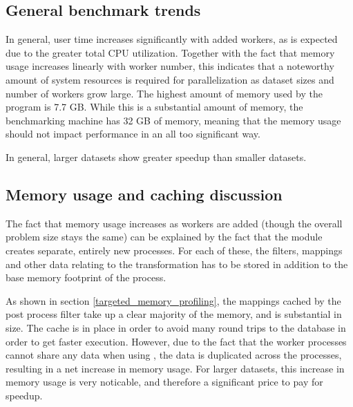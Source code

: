 \subsection{General benchmark trends}
In general, user time increases significantly with added workers, as is expected due to the greater total CPU utilization. Together with the
fact that memory usage increases linearly with worker number, this indicates that a noteworthy amount of system resources is required 
for parallelization as dataset sizes and number of workers grow large. The highest amount of memory used by the program is 7.7 GB. While
this is a substantial amount of memory, the benchmarking machine has 32 GB of memory, meaning that the memory usage should not impact
performance in an all too significant way.

In general, larger datasets show greater speedup than smaller datasets.

\subsection{Memory usage and caching discussion}
The fact that memory usage increases as workers are added (though the overall problem size stays the same)
can be explained by the fact that the  module creates separate, entirely
new processes. For each of these, the filters, mappings and other data relating to the transformation has to be stored in addition to the
base memory footprint of the process. 

As shown in section \ref{targeted_memory_profiling}, the mappings cached by the post process filter take up a clear majority of the memory,
and is substantial in size. The cache is in place in order to avoid many round trips to the database in order to get faster execution. However,
due to the fact that the worker processes cannot share any data when using , the data is duplicated across the processes,
resulting in a net increase in memory usage. For larger datasets, this increase in memory usage is very noticable, and therefore a
significant price to pay for speedup.



